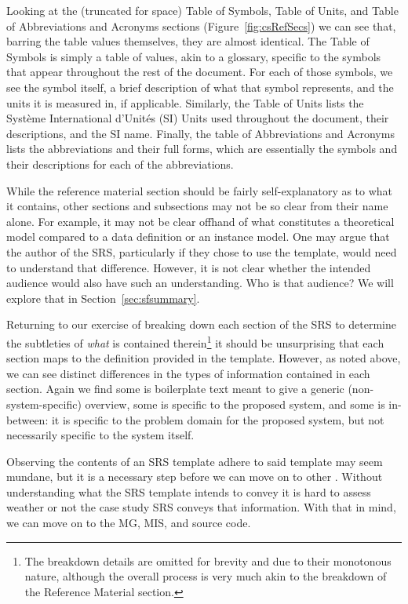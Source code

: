 Looking at the (truncated for space) Table of Symbols, Table of Units, and 
Table of Abbreviations and Acronyms sections (Figure~\ref{fig:csRefSecs}) we 
can see that, barring the table values themselves, they are almost identical. 
The Table of Symbols is simply a table of values, akin to a glossary, specific 
to the symbols that appear throughout the rest of the document. For each of 
those symbols, we see the symbol itself, a brief description of what that 
symbol represents, and the units it is measured in, if applicable. Similarly, 
the Table of Units lists the Syst\`eme International d'Unit\'es (SI) Units used 
throughout the document, their descriptions, and the SI name. Finally, the 
table of Abbreviations and Acronyms lists the abbreviations and their full 
forms, which are essentially the symbols and their descriptions for each of the 
abbreviations.

While the reference material section should be fairly self-explanatory as to 
what it contains, other sections and subsections may not be so clear from their 
name alone. For example, it may not be clear offhand of what constitutes a 
theoretical model compared to a data definition or an instance model. One may 
argue that the author of the SRS, particularly if they chose to use the 
\smithea{} template, would need to understand that difference. However, it is 
not clear whether the intended audience would also have such an understanding. 
Who is that audience? We will explore that in Section~\ref{sec:sfsummary}.

Returning to our exercise of breaking down each section of the SRS to determine 
the subtleties of \emph{what} is contained therein\footnote{The breakdown 
details are omitted for brevity and due to their monotonous nature, although 
the overall process is very much akin to the breakdown of the Reference 
Material section.} it should be unsurprising that each section maps to the 
definition provided in the \smithea{} template. However, as noted above, we can 
see distinct differences in the types of information contained in each section. 
Again we find some is boilerplate text meant to give a generic 
(non-system-specific) overview, some is specific to the proposed system, and 
some is in-between: it is specific to the problem domain for the proposed 
system, but not necessarily specific to the system itself.

Observing the contents of an SRS template adhere to said template may seem 
mundane, but it is a necessary step before we can move on to other \sfs{}. 
Without understanding what the SRS template intends to convey it is hard to 
assess weather or not the case study SRS conveys that information. With that in 
mind, we can move on to the MG, MIS, and source code.

